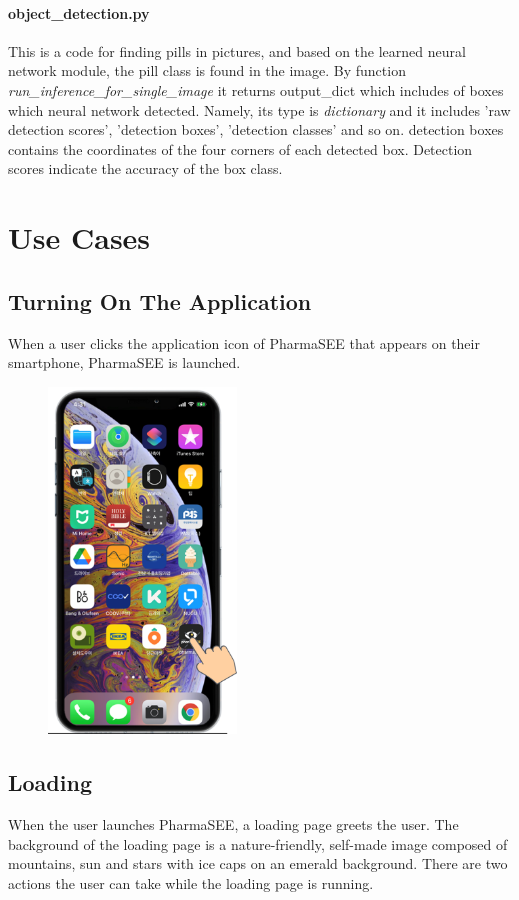 \documentclass[conference]{IEEEtran}
\begin{document}
\paragraph{object\_detection.py}
This is a code for finding pills in pictures, and based on the learned neural network module, the pill class is found in the image. By function \emph{run\_inference\_for\_single\_image} it returns output\_dict which includes of boxes which neural network detected. Namely, its type is \emph{dictionary} and it includes 'raw detection scores', 'detection boxes', 'detection classes' and so on. detection boxes contains the coordinates of the four corners of each detected box. Detection scores indicate the accuracy of the box class.\\

\section{Use Cases}

\subsection{Turning On The Application}
When a user clicks the application icon of PharmaSEE that appears on their smartphone, PharmaSEE is launched.\\

\begin{figure}[h!]
\centering
\includegraphics[width=5cm]{imagefolder/appstart.png}
\caption{}
\label{fig:map}
\end{figure}

\subsection{Loading}
When the user launches PharmaSEE, a loading page greets the user. The background of the loading page is a nature-friendly, self-made image composed of mountains, sun and stars with ice caps on an emerald background. There are two actions the user can take while the loading page is running.\\
\end{document}
